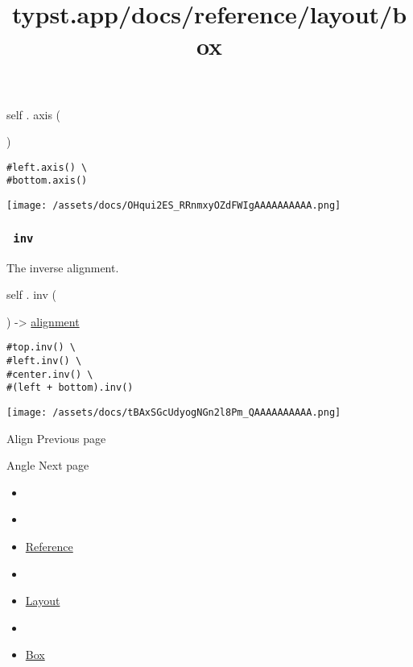 self { . } { axis } (

)

\begin{verbatim}
#left.axis() \
#bottom.axis()
\end{verbatim}

\texttt{[image: /assets/docs/OHqui2ES\_RRnmxyOZdFWIgAAAAAAAAAA.png]}

\subsubsection{\texorpdfstring{\texttt{\ inv\ }}{ inv }}\label{definitions-inv}

The inverse alignment.

self { . } { inv } (

) -\textgreater{} \href{/docs/reference/layout/alignment/}{alignment}

\begin{verbatim}
#top.inv() \
#left.inv() \
#center.inv() \
#(left + bottom).inv()
\end{verbatim}

\texttt{[image: /assets/docs/tBAxSGcUdyogNGn2l8Pm\_QAAAAAAAAAA.png]}

\href{/docs/reference/layout/align/}{\pandocbounded{}}

{ Align } { Previous page }

\href{/docs/reference/layout/angle/}{\pandocbounded{}}

{ Angle } { Next page }


\title{typst.app/docs/reference/layout/box}

\begin{itemize}
\tightlist
\item
  \href{/docs}{}
\item
  
\item
  \href{/docs/reference/}{Reference}
\item
  
\item
  \href{/docs/reference/layout/}{Layout}
\item
  
\item
  \href{/docs/reference/layout/box/}{Box}
\end{itemize}

